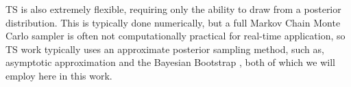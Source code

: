 \documentclass[nonblindrev]{informs3}
\newcommand{\numitems}{K}
\begin{document}
TS is also extremely flexible, requiring only the ability to draw from a posterior distribution. This is typically done numerically, but a full Markov Chain Monte Carlo sampler is often not computationally practical for real-time application, so TS work typically uses an approximate posterior sampling method, such as, asymptotic approximation \citep{ChapelleLi2011} and the Bayesian Bootstrap \citep{eckles2014thompson}, both of which we will employ here in this work.




\end{document}

